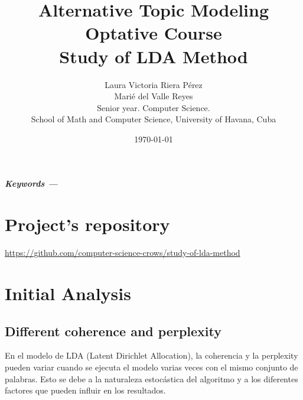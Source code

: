 \documentclass[10pt]{article} %
\title{\normalsize{Alternative Topic Modeling Optative Course}\\
	\Huge\bfseries Study of LDA Method \\
} %
\author{%
	Laura Victoria Riera P\'erez\\
	Mari\'e del Valle Reyes \vspace{1em} \\
	\small Senior year. Computer Science. \\ %
	\small School of Math and Computer Science, University of Havana, Cuba \\ %
}
\date{\footnotesize \today } %
\providecommand{\keywords}[1]
{
	\small	
	\vspace{0.5em}
	\noindent \textbf{\textit{Keywords --- }} #1
}
\renewenvironment{abstract}
{\small
	\begin{center}
		\bfseries \abstractname\vspace{-.5em}\vspace{0pt}
	\end{center}
	\list{}{
		\setlength{\leftmargin}{1.5cm}%
		\setlength{\rightmargin}{\leftmargin}%
	}%
	\item\relax}
{\endlist}
\begin{document}
	\maketitle
	
	\begin{abstract}
		\lipsum[1]
		
		\keywords{}
	\end{abstract}

	\section*{Project's repository}
	
	\begin{center}
		\href{https://github.com/computer-science-crows/study-of-lda-method}{https://github.com/computer-science-crows/study-of-lda-method}
	\end{center}
	
	\section{Initial Analysis}
	
	\subsection{Different coherence and perplexity}
	
	En el modelo de LDA (Latent Dirichlet Allocation), la coherencia y la perplexity pueden variar cuando se ejecuta el modelo varias veces con el mismo conjunto de palabras. Esto se debe a la naturaleza estocástica del algoritmo y a los diferentes factores que pueden influir en los resultados.
	
\end{document}
